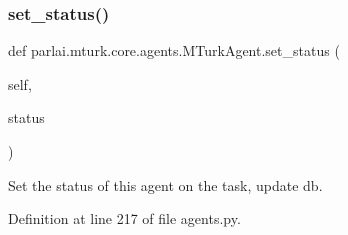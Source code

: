 \subsubsection{\texorpdfstring{set\+\_\+status()}{set\_status()}}
{\footnotesize\ttfamily def parlai.\+mturk.\+core.\+agents.\+M\+Turk\+Agent.\+set\+\_\+status (\begin{DoxyParamCaption}\item[{}]{self,  }\item[{}]{status }\end{DoxyParamCaption})}

\begin{DoxyVerb}Set the status of this agent on the task, update db.
\end{DoxyVerb}
 

Definition at line 217 of file agents.\+py.


